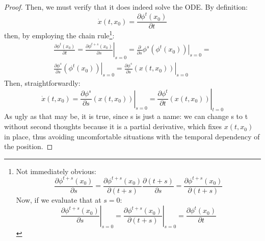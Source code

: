 \begin{proof}
    Then, we must verify that it does indeed solve the ODE. By definition:
    \begin{equation*}
        \dot{x}(t, x_0)=\frac{\partial \phi^t(x_0)}{\partial t}
    \end{equation*}
    then, by employing the chain rule\footnote{
            Not immediately obvious:
            \begin{equation*}
                \frac{\partial \phi^{t+s}(x_0)}{\partial s}=\frac{\partial \phi^{t+s}(x_0)}{\partial(t+s)}\frac{\partial (t+s)}{\partial s}=\frac{\partial \phi^{t+s}(x_0)}{\partial(t+s)}
            \end{equation*}
            Now, if we evaluate that at $s=0$:
            \begin{equation*}
                \left.\frac{\partial \phi^{t+s}(x_0)}{\partial s}\right|_{s=0}=\left.\frac{\partial \phi^{t+s}(x_0)}{\partial(t+s)}\right|_{s=0}=\frac{\partial \phi^t(x_0)}{\partial t}
            \end{equation*}
        }:
    \begin{align*}
        \frac{\partial \phi^t(x_0)}{\partial t}=
        \left.\frac{\partial \phi^{t+s}(x_0)}{\partial s}\right|_{s=0}=\left.\frac{\partial}{\partial s}\phi^{s}(\phi^t(x_0))\right|_{s=0}= \\
        \left.\frac{\partial\phi^{s}}{\partial s}(\phi^t(x_0))\right|_{s=0}=\left.\frac{\partial\phi^{s}}{\partial s}(x(t,x_0))\right|_{s=0}            
    \end{align*}
    Then, straightforwardly:
    \begin{equation*}
        \dot{x}(t, x_0)=\left.\frac{\partial\phi^{s}}{\partial s}(x(t,x_0))\right|_{s=0}=\left.\frac{\partial\phi^{t}}{\partial t}(x(t,x_0))\right|_{t=0}
    \end{equation*}
    As ugly as that may be, it is true, since s is just a name: we can change s to t without second thoughts because it is a partial derivative, which fixes $x(t, x_0)$ in place, thus avoiding uncomfortable situations with the temporal dependency of the position.
\end{proof}

